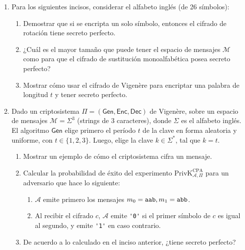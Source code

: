 \documentclass[]{book}
\theoremstyle{definition}
\begin{document}
\begin{enumerate}
\item Para los siguientes incisos, considerar el alfabeto inglés (de 26 símbolos):
\begin{enumerate}
\item Demostrar que si se encripta un solo símbolo, entonces el cifrado de rotación tiene secreto perfecto.
\item ¿Cuál es el mayor tamaño que puede tener el espacio de mensajes $\mathcal{M}$ como para que el cifrado de sustitución monoalfabética posea secreto perfecto?
\item Mostrar cómo usar el cifrado de Vigenère para encriptar una palabra de longitud $t$ y tener secreto perfecto.
\end{enumerate}
\item Dado un criptosistema $\Pi = (\mathsf{Gen}, \mathsf{Enc}, \mathsf{Dec})$
  de Vigenère, sobre un espacio de mensajes $\mathcal{M} = \Sigma^3$ (strings de
  3 caracteres), donde $\Sigma$ es el alfabeto inglés. El algoritmo
  $\mathsf{Gen}$ elige primero el período $t$ de la clave en forma aleatoria y uniforme, con $t
  \in \{1, 2, 3\}$. Luego, elige la clave $k \in \Sigma^*$, tal que $k = t$.
\begin{enumerate}
\item Mostrar un ejemplo de cómo el criptosistema cifra un mensaje.
\item Calcular la probabilidad de éxito del experimento
  $\text{PrivK}_{\mathcal{A},\Pi}^\text{CPA}$ para un adversario que hace lo siguiente:
\begin{enumerate}
  \item $\mathcal{A}$ emite primero los mensajes ${m_0 = \verb+aab+, m_1 = \verb+abb+}$.
  \item Al recibir el cifrado $c$, $\mathcal{A}$ emite \verb+'0'+ si el primer símbolo de $c$ es igual al segundo, y emite \verb+'1'+ en caso contrario.
\end{enumerate}
\item De acuerdo a lo calculado en el inciso anterior, ¿tiene secreto perfecto?
\end{enumerate}


\end{enumerate}
\end{document}
